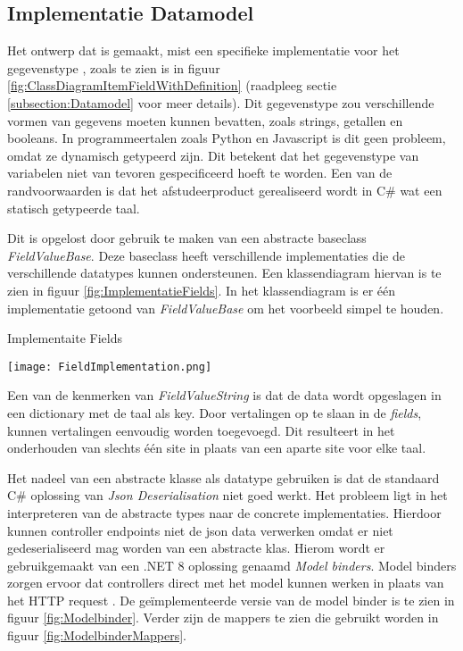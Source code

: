 \subsection{Implementatie Datamodel}
Het ontwerp dat is gemaakt, mist een specifieke implementatie voor het gegevenstype , zoals te zien is in figuur \ref{fig:ClassDiagramItemFieldWithDefinition} (raadpleeg sectie \ref{subsection:Datamodel} voor meer details).
Dit gegevenstype zou verschillende vormen van gegevens moeten kunnen bevatten, zoals strings, getallen en booleans.
In programmeertalen zoals Python en Javascript is dit geen probleem, omdat ze dynamisch getypeerd zijn.
Dit betekent dat het gegevenstype van variabelen niet van tevoren gespecificeerd hoeft te worden.
Een van de randvoorwaarden is dat het afstudeerproduct gerealiseerd wordt in C\# wat een statisch getypeerde taal.

\whitespace
Dit is opgelost door gebruik te maken van een abstracte baseclass \textit{FieldValueBase}.
Deze baseclass  heeft verschillende implementaties die de verschillende datatypes kunnen ondersteunen.
Een klassendiagram hiervan is te zien in figuur \ref{fig:ImplementatieFields}.
In het klassendiagram is er één implementatie getoond van \textit{FieldValueBase} om het voorbeeld simpel te houden.

\whitespace
\begin{graphic}
    \captionsetup{type=figure}
    \caption{Implementaite Fields}
    \texttt{[image: FieldImplementation.png]}
    \label{fig:ImplementatieFields}
\end{graphic}

\newpage

\whitespace
Een van de kenmerken van \textit{FieldValueString} is dat de data wordt opgeslagen in een dictionary met de taal als key.
Door vertalingen op te slaan in de \textit{fields}, kunnen vertalingen eenvoudig worden toegevoegd.
Dit resulteert in het onderhouden van slechts één site in plaats van een aparte site voor elke taal.

\whitespace
Het nadeel van een abstracte klasse als datatype gebruiken is dat de standaard C\# oplossing van \textit{Json Deserialisation} niet goed werkt.
Het probleem ligt in het interpreteren van de abstracte types naar de concrete implementaties.
Hierdoor kunnen controller endpoints niet de json data verwerken omdat er niet gedeserialiseerd mag worden van een abstracte klas.
Hierom wordt er gebruikgemaakt van een .NET 8 oplossing genaamd \textit{Model binders}.
Model binders zorgen ervoor dat controllers direct met het model kunnen werken in plaats van het HTTP request \parencite{ModelBinders}.
De geïmplementeerde versie van de model binder is te zien in figuur \ref{fig:Modelbinder}.
Verder zijn de mappers te zien die gebruikt worden in figuur \ref{fig:ModelbinderMappers}.

